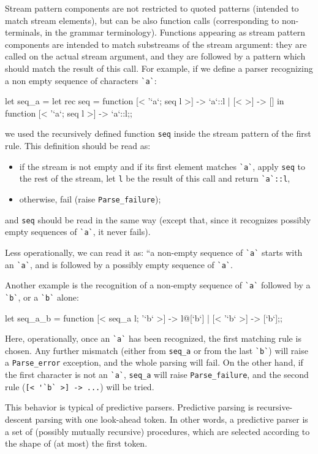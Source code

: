 Stream pattern components are not restricted to quoted patterns
(intended to match stream elements), but can be also function calls
(corresponding to non-terminals, in the grammar terminology).
Functions appearing as stream pattern components are intended to match
substreams of the stream argument: they are called on the actual
stream argument, and they are followed by a pattern which should match
the result of this call. For example, if we define a parser
recognizing a non  empty sequence of characters \verb|`a`|:
\begin{caml_example}
let seq_a =
    let rec seq = function
        [< '`a`; seq l >] -> `a`::l
      | [< >] -> []
    in function [< '`a`; seq l >] -> `a`::l;;
\end{caml_example}
we used the recursively defined function \verb|seq| inside the
stream pattern of the first rule. This definition should be read as:
\begin{itemize}
\item if the stream is not empty and if its first element matches
\verb|`a`|, apply \verb|seq| to the rest of the stream, let {\tt l}
be the result of this call and return \verb|`a`::l|,
\item otherwise, fail (raise \verb|Parse_failure|);
\end{itemize}
and \verb|seq| should be read in the same way (except that, since it
recognizes possibly empty sequences of \verb|`a`|, it never fails).

Less operationally, we can read it as: ``a non-empty sequence of
\verb|`a`| starts with an \verb|`a`|, and is followed by a possibly
empty sequence of \verb|`a`|.

Another example is the recognition of a non-empty sequence of \verb|`a`|
followed by a \verb|`b`|, or a \verb|`b`| alone:
\begin{caml_example}
let seq_a_b = function
  [< seq_a l; '`b` >] -> l@[`b`]
| [< '`b` >] -> [`b`];;
\end{caml_example}
Here, operationally, once an \verb|`a`| has been recognized, the first
matching rule is chosen. Any further mismatch (either from
\verb|seq_a| or from the last \verb|`b`|) will raise a
\verb|Parse_error| exception, and the whole parsing will fail. On the
other hand, if the first character is not an \verb|`a`|, \verb|seq_a|
will raise \verb|Parse_failure|, and the second rule
(\verb|[< '`b` >] -> ...|) will be tried.

This behavior is typical of predictive parsers.  Predictive parsing
is recursive-descent parsing with one look-ahead token. In other
words, a predictive parser is a set of (possibly mutually recursive)
procedures, which are selected according to the shape of (at most) the
first token.


